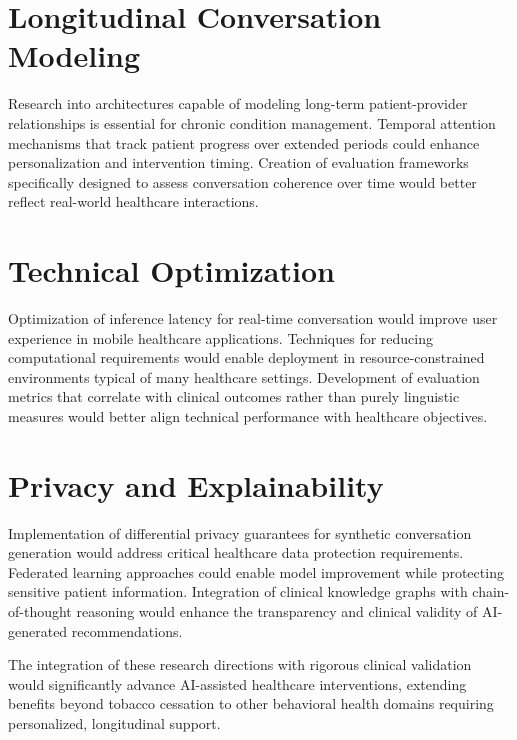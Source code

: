 \section{Longitudinal Conversation Modeling}

Research into architectures capable of modeling long-term patient-provider relationships is essential for chronic condition management. Temporal attention mechanisms that track patient progress over extended periods could enhance personalization and intervention timing. Creation of evaluation frameworks specifically designed to assess conversation coherence over time would better reflect real-world healthcare interactions.

\section{Technical Optimization}

Optimization of inference latency for real-time conversation would improve user experience in mobile healthcare applications. Techniques for reducing computational requirements would enable deployment in resource-constrained environments typical of many healthcare settings. Development of evaluation metrics that correlate with clinical outcomes rather than purely linguistic measures would better align technical performance with healthcare objectives.

\section{Privacy and Explainability}

Implementation of differential privacy guarantees for synthetic conversation generation would address critical healthcare data protection requirements. Federated learning approaches could enable model improvement while protecting sensitive patient information. Integration of clinical knowledge graphs with chain-of-thought reasoning would enhance the transparency and clinical validity of AI-generated recommendations.

The integration of these research directions with rigorous clinical validation would significantly advance AI-assisted healthcare interventions, extending benefits beyond tobacco cessation to other behavioral health domains requiring personalized, longitudinal support.
